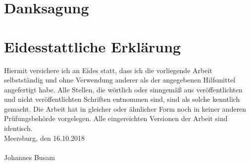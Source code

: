 \newpage

\section*{Danksagung}

\newpage

\section*{Eidesstattliche Erklärung}

Hiermit versichere ich an Eides statt, dass ich die vorliegende Arbeit selbstständig und
ohne Verwendung anderer als der angegebenen Hilfsmittel angefertigt habe. Alle Stellen,
die wörtlich oder sinngemäß aus veröffentlichten und nicht veröffentlichten Schriften
entnommen sind, sind als solche kenntlich gemacht. Die Arbeit hat in gleicher oder
ähnlicher Form noch in keiner anderen Prüfungsbehörde vorgelegen. Alle eingereichten
Versionen der Arbeit sind identisch.\\
\newline
\noindent
Meersburg, den 16.10.2018 \\
\vspace{1.5cm} \\
Johannes Busam\newline

\newpage
